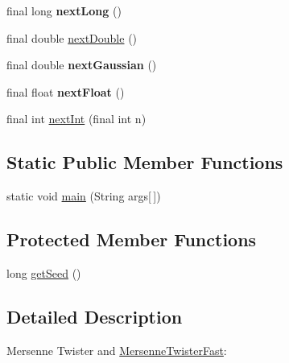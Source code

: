 \begin{CompactItemize}
\item 
\hypertarget{classjenes_1_1utils_1_1_mersenne_twister_fast_1de4f36e5e4035569bbb79bb06d4e9c7}{
final long \textbf{nextLong} ()}
\label{classjenes_1_1utils_1_1_mersenne_twister_fast_1de4f36e5e4035569bbb79bb06d4e9c7}

\item 
final double \hyperlink{classjenes_1_1utils_1_1_mersenne_twister_fast_64238ab497c1e504c798355f682ea2b9}{nextDouble} ()
\item 
\hypertarget{classjenes_1_1utils_1_1_mersenne_twister_fast_4af0dd9a4366e476e4d45568cbb558e9}{
final double \textbf{nextGaussian} ()}
\label{classjenes_1_1utils_1_1_mersenne_twister_fast_4af0dd9a4366e476e4d45568cbb558e9}

\item 
\hypertarget{classjenes_1_1utils_1_1_mersenne_twister_fast_f2d30f1dec2a94ca26a3b1ccc0624ce9}{
final float \textbf{nextFloat} ()}
\label{classjenes_1_1utils_1_1_mersenne_twister_fast_f2d30f1dec2a94ca26a3b1ccc0624ce9}

\item 
final int \hyperlink{classjenes_1_1utils_1_1_mersenne_twister_fast_e66ea69e37e4866fbb3beecb4e66577a}{nextInt} (final int n)
\end{CompactItemize}
\subsection*{Static Public Member Functions}
\begin{CompactItemize}
\item 
static void \hyperlink{classjenes_1_1utils_1_1_mersenne_twister_fast_5c955ea4cf1b925290dd92ddecc0c510}{main} (String args\mbox{[}$\,$\mbox{]})
\end{CompactItemize}
\subsection*{Protected Member Functions}
\begin{CompactItemize}
\item 
long \hyperlink{classjenes_1_1utils_1_1_mersenne_twister_fast_88963c0469e0bad7a1834469cf0f7a10}{getSeed} ()
\end{CompactItemize}


\subsection{Detailed Description}
Mersenne Twister and \hyperlink{classjenes_1_1utils_1_1_mersenne_twister_fast}{MersenneTwisterFast}: 

